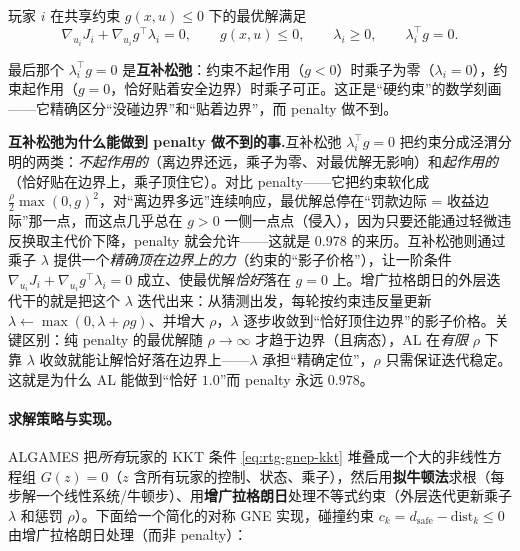 \begin{definition}\label{def:rtg-gnep-kkt}
玩家 $i$ 在共享约束 $g(x,u)\le0$ 下的最优解满足
\begin{equation}
  \nabla_{u_i}J_i+\nabla_{u_i}g^\top\lambda_i=0,\qquad g(x,u)\le0,\qquad \lambda_i\ge0,\qquad \lambda_i^\top g=0.
  \label{eq:rtg-gnep-kkt}
\end{equation}
\end{definition}

\noindent 最后那个 $\lambda_i^\top g=0$ 是\textbf{互补松弛}：约束不起作用（$g<0$）时乘子为零（$\lambda_i=0$），约束起作用（$g=0$，恰好贴着安全边界）时乘子可正。这正是“硬约束”的数学刻画——它精确区分“没碰边界”和“贴着边界”，而 penalty 做不到。

\begin{insight}
\textbf{互补松弛为什么能做到 penalty 做不到的事.}\;互补松弛 $\lambda_i^\top g=0$ 把约束分成泾渭分明的两类：\emph{不起作用的}（离边界还远，乘子为零、对最优解无影响）和\emph{起作用的}（恰好贴在边界上，乘子顶住它）。对比 penalty——它把约束软化成 $\tfrac{\rho}{2}\max(0,g)^2$，对“离边界多远”连续响应，最优解总停在“罚款边际 = 收益边际”那一点，而这点几乎总在 $g>0$ 一侧一点点（侵入），因为只要还能通过轻微违反换取主代价下降，penalty 就会允许——这就是 $0.978$ 的来历。互补松弛则通过乘子 $\lambda$ 提供一个\emph{精确顶在边界上的力}（约束的“影子价格”），让一阶条件 $\nabla_{u_i}J_i+\nabla_{u_i}g^\top\lambda_i=0$ 成立、使最优解\emph{恰好}落在 $g=0$ 上。增广拉格朗日的外层迭代干的就是把这个 $\lambda$ 迭代出来：从猜测出发，每轮按约束违反量更新 $\lambda\leftarrow\max(0,\lambda+\rho g)$、并增大 $\rho$，$\lambda$ 逐步收敛到“恰好顶住边界”的影子价格。关键区别：纯 penalty 的最优解随 $\rho\to\infty$ 才趋于边界（且病态），AL 在\emph{有限} $\rho$ 下靠 $\lambda$ 收敛就能让解恰好落在边界上——$\lambda$ 承担“精确定位”，$\rho$ 只需保证迭代稳定。这就是为什么 AL 能做到“恰好 $1.0$”而 penalty 永远 $0.978$。
\end{insight}

\paragraph{求解策略与实现。}
ALGAMES 把\emph{所有}玩家的 KKT 条件 \cref{eq:rtg-gnep-kkt} 堆叠成一个大的非线性方程组 $G(z)=0$（$z$ 含所有玩家的控制、状态、乘子），然后用\textbf{拟牛顿法}求根（每步解一个线性系统/牛顿步）、用\textbf{增广拉格朗日}处理不等式约束（外层迭代更新乘子 $\lambda$ 和惩罚 $\rho$）。下面给一个简化的对称 GNE 实现，碰撞约束 $c_k=d_{\text{safe}}-\text{dist}_k\le0$ 由增广拉格朗日处理（而非 penalty）：

